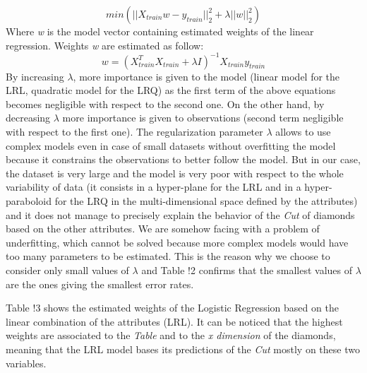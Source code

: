 \documentclass[
]{article}
\begin{document}
\[
min(||X_{train}w-y_{train}||^2_2+\lambda||w||^2_2)
\] Where \emph{w} is the model vector containing estimated weights of
the linear regression. Weights \emph{w} are estimated as follow: \[
w=(X_{train}^T X_{train}+\lambda I)^{-1}X_{train}y_{train}
\] By increasing \(\lambda\), more importance is given to the model
(linear model for the LRL, quadratic model for the LRQ) as the first
term of the above equations becomes negligible with respect to the
second one. On the other hand, by decreasing \(\lambda\) more importance
is given to observations (second term negligible with respect to the
first one). The regularization parameter \(\lambda\) allows to use
complex models even in case of small datasets without overfitting the
model because it constrains the observations to better follow the model.
But in our case, the dataset is very large and the model is very poor
with respect to the whole variability of data (it consists in a
hyper-plane for the LRL and in a hyper-paraboloid for the LRQ in the
multi-dimensional space defined by the attributes) and it does not
manage to precisely explain the behavior of the \emph{Cut} of diamonds
based on the other attributes. We are somehow facing with a problem of
underfitting, which cannot be solved because more complex models would
have too many parameters to be estimated. This is the reason why we
choose to consider only small values of \(\lambda\) and Table !2
confirms that the smallest values of \(\lambda\) are the ones giving the
smallest error rates.

Table !3 shows the estimated weights of the Logistic Regression based on
the linear combination of the attributes (LRL). It can be noticed that
the highest weights are associated to the \emph{Table} and to the
\emph{x dimension} of the diamonds, meaning that the LRL model bases its
predictions of the \emph{Cut} mostly on these two variables.
\end{document}
